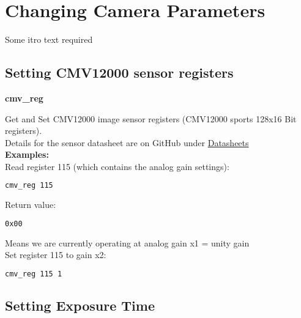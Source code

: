 \section{Changing Camera Parameters}

Some itro text required\\

\subsection{Setting CMV12000 sensor registers}

\textbf{cmv\_reg}

Get and Set CMV12000 image sensor registers (CMV12000 sports 128x16 Bit registers).\\

Details for the sensor datasheet are on GitHub under \href{https://github.com/apertus-open-source-cinema/beta-hardware/tree/master/Datasheets}{Datasheets}\\

\textbf{Examples:}\\

Read register 115 (which contains the analog gain settings): 

\begin{lstlisting}[language=bash,morekeywords=$,keywordstyle=\bfseries,frame=none,xleftmargin=.25in,belowskip=2em, aboveskip=2em]
cmv_reg 115
\end{lstlisting} 

Return value:

\begin{lstlisting}[language=bash,morekeywords=$,keywordstyle=\bfseries,frame=none,xleftmargin=.25in,belowskip=2em, aboveskip=2em]
0x00
\end{lstlisting} 

Means we are currently operating at analog gain x1 = unity gain\\


Set register 115 to gain x2: 

\begin{lstlisting}[language=bash,morekeywords=$,keywordstyle=\bfseries,frame=none,xleftmargin=.25in,belowskip=2em, aboveskip=2em]
cmv_reg 115 1
\end{lstlisting}



\subsection{Setting Exposure Time}

